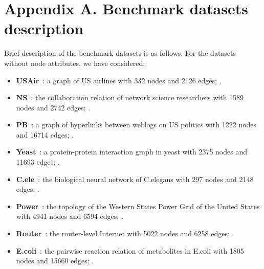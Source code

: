 \documentclass[11pt]{article}
\begin{document}



\newpage 

\section*{Appendix A. Benchmark datasets description}
Brief description of the benchmark datasets is as follows. For the datasets without node attributes, we have considered:
\vspace{-1mm}
\begin{itemize}
\item \textbf{USAir}~\citep{usair}: a graph of US airlines with 332 nodes and 2126 edges; .
\item \textbf{NS}~\citep{newman2006finding}: the collaboration relation of network science researchers with 1589 nodes and 2742 edges; .
\item \textbf{PB}~\citep{ackland2005mapping}: a graph of hyperlinks between weblogs on US politics  with 1222 nodes and 16714 edges; .
\item \textbf{Yeast}~\citep{von2002comparative}: a protein-protein interaction graph in yeast with 2375 nodes and 11693 edges; . 
\item \textbf{C.ele}~\citep{watts1998collective}: the biological neural network of C.elegans with 297 nodes and 2148 edges; .
\item \textbf{Power}~\citep{watts1998collective}: the topology of the Western States Power Grid of the United States with 4941 nodes and 6594 edges; .
\item \textbf{Router}~\citep{spring2002measuring}: the router-level Internet with 5022 nodes and 6258 edges; .
\item \textbf{E.coli}~\citep{zhang2018beyond}: the pairwise reaction relation of metabolites in E.coli with 1805 nodes and 15660 edges; .
\vspace{-1mm}
\end{itemize}
\end{document}

